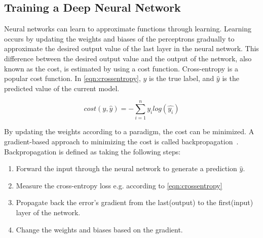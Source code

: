 \documentclass[oneside, english, bibtex]{kththesis}
\begin{document}



\subsection{Training a Deep Neural Network}

Neural networks can learn to approximate functions through learning. Learning occurs by updating the weights and biases of the perceptrons gradually to approximate the desired output value of the last layer in the neural network. This difference between the desired output value and the output of the network, also known as the cost, is estimated by using a cost function. Cross-entropy is a popular cost function. In \autoref{eqn:crossentropy}, \(y\) is the true label, and \(\hat{y}\) is the predicted value of the current model.

\begin{equation}
    cost(y, \hat{y}) = - \sum\limits_{i=1}^{n} y_i log(\hat{y_i})
    \label{eqn:crossentropy}
\end{equation}

By updating the weights according to a paradigm, the cost can be minimized. A gradient-based approach to minimizing the cost is called backpropagation~\cite{Rumelhart1986}. Backpropagation is defined as taking the following steps:

\begin{enumerate}
\item Forward the input through the neural network to generate a prediction $\hat{y}$.
\item Measure the cross-entropy loss e.g. according to \autoref{eqn:crossentropy}
\item Propagate back the error’s gradient from the last(output) to the first(input) layer of the network.
\item Change the weights and biases based on the gradient.
\end{enumerate}
\end{document}
